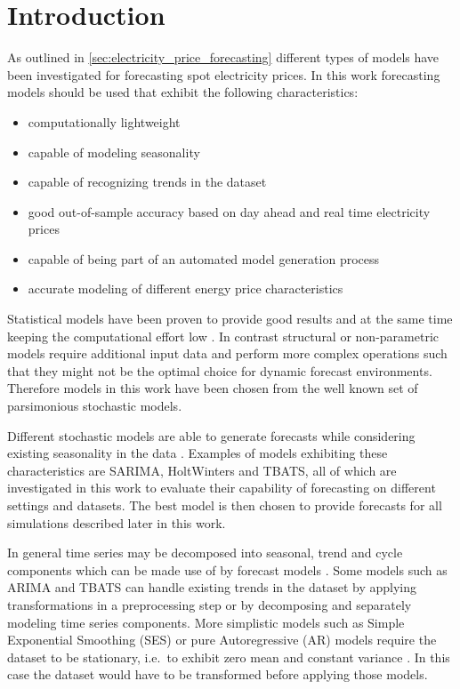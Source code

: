 
\section{Introduction}

As outlined in \ref{sec:electricity_price_forecasting} different types of models have been investigated for forecasting spot electricity prices. In this work forecasting models should be used that exhibit the following characteristics: 

\begin{itemize}
	\item computationally lightweight
	\item capable of modeling seasonality
	\item capable of recognizing trends in the dataset
	\item good out-of-sample accuracy based on day ahead and real time electricity prices
	\item capable of being part of an automated model generation process
	\item accurate modeling of different energy price characteristics
\end{itemize}

Statistical models have been proven to provide good results and at the same time keeping the computational effort low \cite{aggarwal2009electricity,bunn2003forecasting}. In contrast structural or non-parametric models require additional input data and perform more complex operations such that they might not be the optimal choice for dynamic forecast environments. Therefore models in this work have been chosen from the well known set of parsimonious stochastic models. 

Different stochastic models are able to generate forecasts while considering existing seasonality in the data \cite{gould2008forecasting,de2011forecasting}. Examples of models exhibiting these characteristics are SARIMA, HoltWinters and TBATS, all of which are investigated in this work to evaluate their capability of forecasting on different settings and datasets. The best model is then chosen to provide forecasts for all simulations described later in this work. 

In general time series may be decomposed into seasonal, trend and cycle components which can be made use of by forecast models \cite{de2011forecasting}. Some models such as ARIMA and TBATS can handle existing trends in the dataset by applying transformations in a preprocessing step or by decomposing and separately modeling time series components. More simplistic models such as Simple Exponential Smoothing (SES) or pure Autoregressive (AR) models require the dataset to be stationary, i.e.~to exhibit zero mean and constant variance \cite{weron2007modeling,hyndman2012forecasting}. In this case the dataset would have to be transformed before applying those models. 

